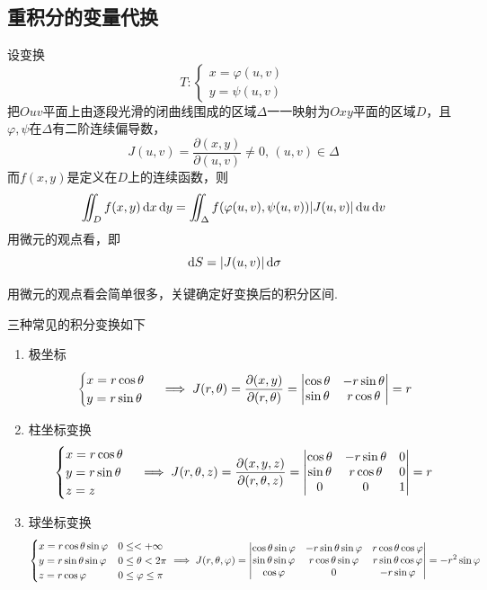 \subsection{重积分的变量代换}
\begin{theorem}
设变换
\[T:\begin{cases}x=\varphi(u,v)\\y=\psi(u,v)\end{cases}\]
把$Ouv$平面上由逐段光滑的闭曲线围成的区域$\Delta$一一映射为$Oxy$平面的区域$D$，且$\varphi,\psi$在$\Delta$有二阶连续偏导数，
\[J(u,v)=\frac{\partial(x,y)}{\partial(u,v)}\ne 0,\,(u,v)\in\Delta\]
而$f(x,y)$是定义在$D$上的连续函数，则
\[\iint_Df(x,y)\,\mathrm{d} x\,\mathrm{d} y=\iint_\Delta f(\varphi(u,v),\psi(u,v))|J(u,v)|\,\mathrm{d} u\,\mathrm{d} v\]
用微元的观点看，即
\[\,\mathrm{d} S=|J(u,v)|\,\mathrm{d}\sigma\]
\end{theorem}
用微元的观点看会简单很多，关键确定好变换后的积分区间.
\par 三种常见的积分变换如下
\begin{enumerate}
	\item 极坐标
	\[\begin{cases}x=r\cos\theta\\y=r\sin\theta\end{cases}\implies J(r,\theta)=\frac{\partial(x,y)}{\partial(r,\theta)}=\begin{vmatrix}\cos\theta & -r\sin\theta\\\sin\theta & r\cos\theta\end{vmatrix}=r\]
	\item 柱坐标变换
	\[\begin{cases}x=r\cos\theta\\y=r\sin\theta\\z=z\end{cases}\implies J(r,\theta,z)=\frac{\partial(x,y,z)}{\partial(r,\theta,z)}=\begin{vmatrix}\cos\theta & -r\sin\theta & 0\\\sin\theta & r\cos\theta & 0\\ 0 & 0 & 1\end{vmatrix}=r\]
	\item 球坐标变换
	\[\begin{cases}x=r\cos\theta\sin\varphi&0\leq<+\infty\\y=r\sin\theta\sin\varphi&0\leq\theta<2\pi\\z=r\cos\varphi & 0\leq\varphi\leq\pi\end{cases}\implies J(r,\theta,\varphi)=\begin{vmatrix}\cos\theta\sin\varphi & -r\sin\theta\sin\varphi & r\cos\theta\cos\varphi\\\sin\theta\sin\varphi & r\cos\theta\sin\varphi & r\sin\theta\cos\varphi\\ \cos\varphi & 0 & -r\sin\varphi\end{vmatrix}=-r^2\sin\varphi\]
\end{enumerate}

